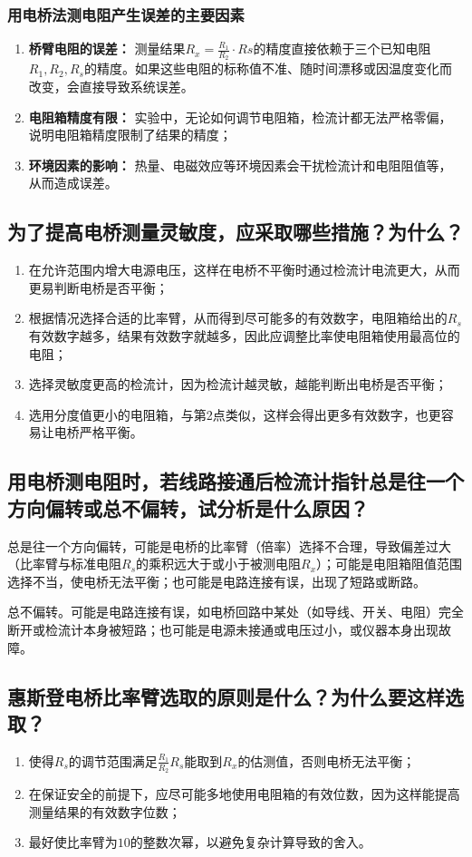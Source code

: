 \documentclass[]{../template/Report}%
\begin{document}
\begin{fullreportonly}
\subsubsection{用电桥法测电阻产生误差的主要因素}
\begin{enumerate}
    \item \textbf{桥臂电阻的误差：} 测量结果$ R_x = \frac{R_1}{R_2} \cdot Rs $的精度直接依赖于三个已知电阻$R_1, R_2, R_s$的精度。如果这些电阻的标称值不准、随时间漂移或因温度变化而改变，会直接导致系统误差。
    \item \textbf{电阻箱精度有限：} 实验中，无论如何调节电阻箱，检流计都无法严格零偏，说明电阻箱精度限制了结果的精度；
    \item \textbf{环境因素的影响：} 热量、电磁效应等环境因素会干扰检流计和电阻阻值等，从而造成误差。
\end{enumerate}
\subsection{为了提高电桥测量灵敏度，应采取哪些措施？为什么？}
\begin{enumerate}
    \item 在允许范围内增大电源电压，这样在电桥不平衡时通过检流计电流更大，从而更易判断电桥是否平衡；
    \item 根据情况选择合适的比率臂，从而得到尽可能多的有效数字，电阻箱给出的$R_s$有效数字越多，结果有效数字就越多，因此应调整比率使电阻箱使用最高位的电阻；
    \item 选择灵敏度更高的检流计，因为检流计越灵敏，越能判断出电桥是否平衡；
    \item 选用分度值更小的电阻箱，与第2点类似，这样会得出更多有效数字，也更容易让电桥严格平衡。
\end{enumerate}
\subsection{用电桥测电阻时，若线路接通后检流计指针总是往一个方向偏转或总不偏转，试分析是什么原因？}
总是往一个方向偏转，可能是电桥的比率臂（倍率）选择不合理，导致偏差过大（比率臂与标准电阻$R_s$的乘积远大于或小于被测电阻$R_x$）；可能是电阻箱阻值范围选择不当，使电桥无法平衡；也可能是电路连接有误，出现了短路或断路。

总不偏转。可能是电路连接有误，如电桥回路中某处（如导线、开关、电阻）完全断开或检流计本身被短路；也可能是电源未接通或电压过小，或仪器本身出现故障。
\subsection{惠斯登电桥比率臂选取的原则是什么？为什么要这样选取？}
\begin{enumerate}
    \item 使得$R_s$的调节范围满足$\frac{R_1}{R_2}R_s$能取到$R_x$的估测值，否则电桥无法平衡；
    \item 在保证安全的前提下，应尽可能多地使用电阻箱的有效位数，因为这样能提高测量结果的有效数字位数；
    \item 最好使比率臂为$10$的整数次幂，以避免复杂计算导致的舍入。
\end{enumerate}



\end{fullreportonly}
\end{document}
